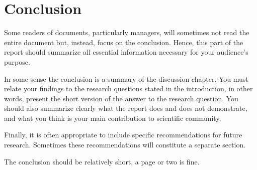 \cleardoublepage
\chapter{Conclusion}
\label{chap:conclusion} 


Some readers of documents, particularly managers, will sometimes not read the entire document but, instead, focus on the conclusion. Hence, this part of the report should summarize all essential information necessary for your audience's purpose. 

In some sense the conclusion is a summary of the discussion chapter. You must relate your findings to the research questions stated in the  introduction, in other words, present the short version of the answer to the research question.
You should also summarize clearly what the report does and does not demonstrate, and what you think is your main contribution to scientific community.

Finally, it is often appropriate to include specific recommendations for future research. Sometimes these recommendations will constitute a separate section.

The conclusion should be relatively short, a page or two is fine.


\lipsum[81-87]

